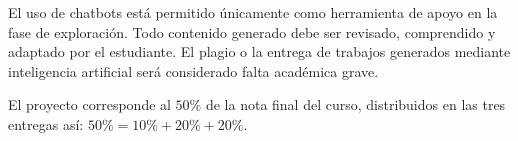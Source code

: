 \documentclass[11pt]{article}
\begin{document}
El uso de chatbots está permitido únicamente como herramienta de apoyo en la fase de exploración. Todo contenido generado debe ser revisado, comprendido y adaptado por el estudiante. El plagio o la entrega de trabajos generados mediante inteligencia artificial será considerado falta académica grave.

El proyecto corresponde al $50\%$ de la nota final del curso, distribuidos en las tres entregas así: $50\%=10\%+20\%+20\%$.
\end{document}
